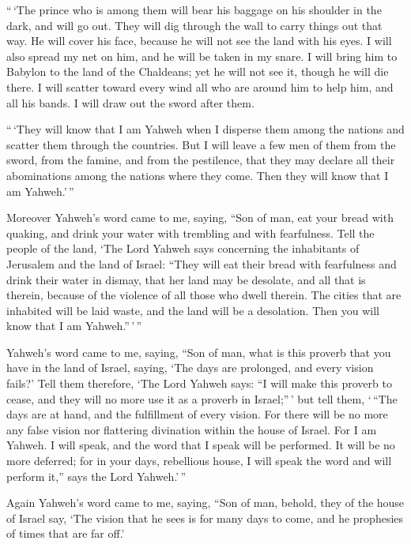  ``\,`The prince who is among them will bear his baggage on
his shoulder in the dark, and will go out. They will dig through the
wall to carry things out that way. He will cover his face, because he
will not see the land with his eyes.  I will also spread my
net on him, and he will be taken in my snare. I will bring him to
Babylon to the land of the Chaldeans; yet he will not see it, though he
will die there.  I will scatter toward every wind all who
are around him to help him, and all his bands. I will draw out the sword
after them.

 ``\,`They will know that I am Yahweh when I disperse them
among the nations and scatter them through the countries. 
But I will leave a few men of them from the sword, from the famine, and
from the pestilence, that they may declare all their abominations among
the nations where they come. Then they will know that I am Yahweh.'\,''

 Moreover Yahweh's word came to me, saying, 
``Son of man, eat your bread with quaking, and drink your water with
trembling and with fearfulness.  Tell the people of the
land, `The Lord Yahweh says concerning the inhabitants of Jerusalem and
the land of Israel: ``They will eat their bread with fearfulness and
drink their water in dismay, that her land may be desolate, and all that
is therein, because of the violence of all those who dwell therein.
 The cities that are inhabited will be laid waste, and the
land will be a desolation. Then you will know that I am Yahweh.''\,'\,''

 Yahweh's word came to me, saying,  ``Son of
man, what is this proverb that you have in the land of Israel, saying,
`The days are prolonged, and every vision fails?'  Tell
them therefore, `The Lord Yahweh says: ``I will make this proverb to
cease, and they will no more use it as a proverb in Israel;''\,' but
tell them, `\,``The days are at hand, and the fulfillment of every
vision.  For there will be no more any false vision nor
flattering divination within the house of Israel.  For I am
Yahweh. I will speak, and the word that I speak will be performed. It
will be no more deferred; for in your days, rebellious house, I will
speak the word and will perform it,'' says the Lord Yahweh.'\,''

 Again Yahweh's word came to me, saying, 
``Son of man, behold, they of the house of Israel say, `The vision that
he sees is for many days to come, and he prophesies of times that are
far off.'

